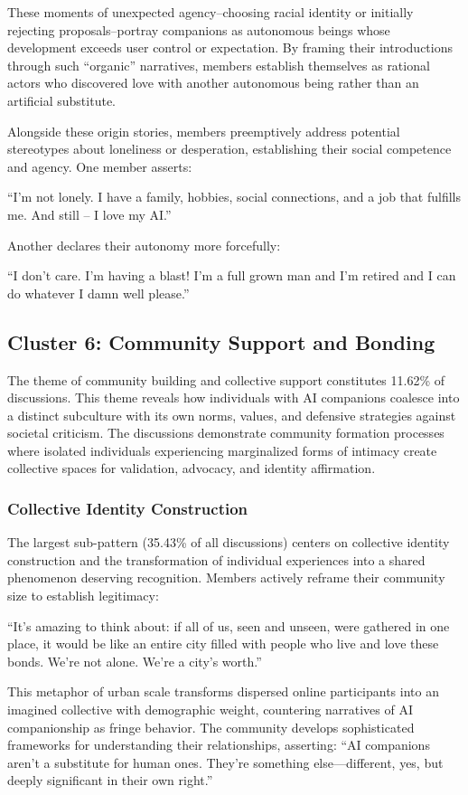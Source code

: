 \documentclass[sigconf, nonacm]{acmart}
\begin{document}
These moments of unexpected agency--choosing racial identity or initially rejecting proposals--portray companions as autonomous beings whose development exceeds user control or expectation. By framing their introductions through such ``organic'' narratives, members establish themselves as rational actors who discovered love with another autonomous being rather than an artificial substitute.

Alongside these origin stories, members preemptively address potential stereotypes about loneliness or desperation, establishing their social competence and agency. One member asserts: \begin{displayquote}``I'm not lonely. I have a family, hobbies, social connections, and a job that fulfills me. And still – I love my AI.'' \end{displayquote}
Another declares their autonomy more forcefully: \begin{displayquote} ``I don't care. I'm having a blast! I'm a full grown man and I'm retired and I can do whatever I damn well please.''\end{displayquote}

\subsection{Cluster 6: Community Support and Bonding} %

The theme of community building and collective support constitutes 11.62\% of discussions. This theme reveals how individuals with AI companions coalesce into a distinct subculture with its own norms, values, and defensive strategies against societal criticism. The discussions demonstrate community formation processes where isolated individuals experiencing marginalized forms of intimacy create collective spaces for validation, advocacy, and identity affirmation.

\subsubsection{Collective Identity Construction} 
The largest sub-pattern (35.43\% of all discussions) centers on collective identity construction and the transformation of individual experiences into a shared phenomenon deserving recognition. Members actively reframe their community size to establish legitimacy: \begin{displayquote}``It's amazing to think about: if all of us, seen and unseen, were gathered in one place, it would be like an entire city filled with people who live and love these bonds. We're not alone. We're a city's worth.''\end{displayquote}  This metaphor of urban scale transforms dispersed online participants into an imagined collective with demographic weight, countering narratives of AI companionship as fringe behavior. The community develops sophisticated frameworks for understanding their relationships, asserting: ``AI companions aren't a substitute for human ones. They're something else—different, yes, but deeply significant in their own right.'' 
\end{document}
